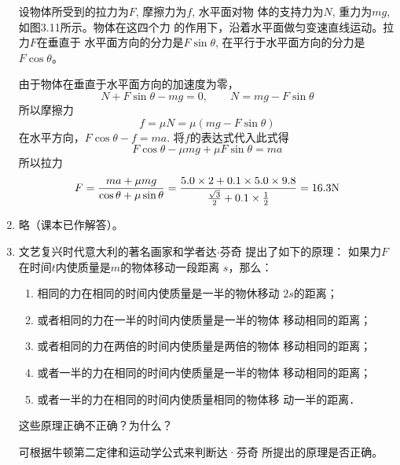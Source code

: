 \begin{enumerate}
\begin{figure}[htp]
\begin{tikzpicture}[>=latex]
\end{tikzpicture}
    \caption{}
\end{figure}

\begin{solution}
设物体所受到的拉力为$F$, 摩擦力为$f$, 水平面对物
体的支持力为$N$, 重力为$mg$, 如图3.11所示。物体在这四个力
的作用下，沿着水平面做匀变速直线运动。拉力$F$在垂直于
水平面方向的分力是$F\sin\theta$,
在平行于水平面方向的分力是$F\cos\theta$。

由于物体在垂直于水平面方向的加速度为零，
\[N+F\sin\theta-mg=0,\qquad  N=mg-F\sin\theta\]
所以摩擦力
\[f=\mu N=\mu (mg-F\sin\theta)\]
在水平方向，$F\cos\theta-f=ma$. 将$f$的表达式代入此式得
\[F\cos\theta-\mu mg+\mu F\sin\theta=ma\]
所以拉力
\[F=\frac{ma+\mu mg}{\cos\theta+\mu \sin\theta}=\frac{5.0\x 2+0.1\x 5.0\x 9.8}{\frac{\sqrt{3}}{2}+0.1\x \frac{1}{2}}=16.3{\rm N}\]
\end{solution}
\item  略（课本已作解答）。

\item    文艺复兴时代意大利的著名画家和学者达$\cdot$芬奇
提出了如下的原理：
    如果力$F$在时间$t$内使质量是$m$的物体移动一段距离
$s$，那么：
\begin{enumerate}
    \item  相同的力在相同的时间内使质量是一半的物休移动
    $2s$的距离；
\item  或者相同的力在一半的时间内使质量是一半的物体
移动相同的距离；
\item  或者相同的力在两倍的时间内使质量是两倍的物体
移动相同的距离；
\item  或者一半的力在相同的时间内使质量是一半的物体
移动相同的距离；
\item  或者一半的力在相同的时间内使质量相同的物体移
动一半的距离．
\end{enumerate}
    这些原理正确不正确？为什么？

    \begin{solution}
可根据牛顿第二定律和运动学公式来判断达·芬奇
所提出的原理是否正确。


\end{solution}
\end{enumerate}
